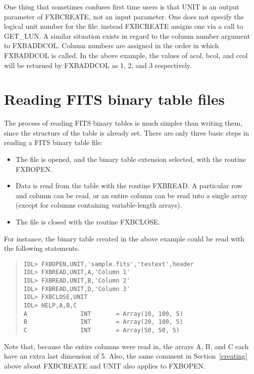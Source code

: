 One thing that sometimes confuses first time users is that UNIT is an output
parameter of FXBCREATE, not an input parameter.  One does not specify the
logical unit number for the file; instead FXBCREATE assigns one via a call to
GET\_LUN.  A similar situation exists in regard to the column number argument
to FXBADDCOL.  Column numbers are assigned in the order in which FXBADDCOL is
called.  In the above example, the values of acol, bcol, and ccol will be
returned by FXBADDCOL as 1, 2, and 3 respectively.

\section{Reading FITS binary table files}

The process of reading FITS binary tables is much simpler than writing them,
since the structure of the table is already set.  There are only three basic
steps in reading a FITS binary table file:
%
\begin{itemize}
\item
	The file is opened, and the binary table extension selected, with the
	routine FXBOPEN.
\item
	Data is read from the table with the routine FXBREAD.  A particular row
	and column can be read, or an entire column can be read into a single
	array (except for columns containing variable-length arrays).
\item
	The file is closed with the routine FXBCLOSE.
\end{itemize}
%
For instance, the binary table created in the above example could be read with
the following statements.
%
\begin{quote}
\begin{verbatim}
IDL> FXBOPEN,UNIT,'sample.fits','testext',header
IDL> FXBREAD,UNIT,A,'Column 1'
IDL> FXBREAD,UNIT,B,'Column 2'
IDL> FXBREAD,UNIT,D,'Column 3'
IDL> FXBCLOSE,UNIT
IDL> HELP,A,B,C
A               INT       = Array(10, 100, 5)
B               INT       = Array(20, 100, 5)
C               INT       = Array(50, 50, 5)
\end{verbatim}
\end{quote}
%
Note that, because the entire columns were read in, the arrays A, B, and C each
have an extra last dimension of 5.  Also, the same comment in
Section~\ref{creating} above about FXBCREATE and UNIT also applies to FXBOPEN.

